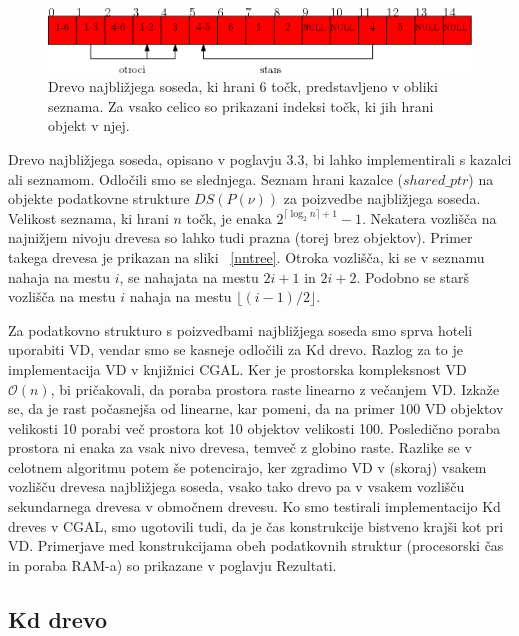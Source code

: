 \documentclass[a4paper, 12pt]{book}
\newcommand{\OO}{\ensuremath{\mathcal{O}}} %
\begin{document}
\begin{figure}
\centerline{\includegraphics[scale=0.5]{pics/nnarray-png.png}}
\caption{Drevo najbližjega soseda, ki hrani 6 točk, predstavljeno v obliki seznama. Za vsako celico so prikazani indeksi točk, ki jih hrani objekt v njej.}
\label{nnarray}
\end{figure}

Drevo najbližjega soseda, opisano v poglavju 3.3, bi lahko implementirali s kazalci ali seznamom. Odločili smo se slednjega. Seznam hrani kazalce ($shared{\_}ptr$) na objekte podatkovne strukture $DS(P(\nu))$ za poizvedbe najbližjega soseda. Velikost seznama, ki hrani $n$ točk, je enaka $2^{\lceil \log_2n \rceil+1}-1$. Nekatera vozlišča na najnižjem nivoju drevesa so lahko tudi prazna (torej brez objektov). Primer takega drevesa je prikazan na sliki ~\ref{nntree}. Otroka vozlišča, ki se v seznamu nahaja na mestu $i$, se nahajata na mestu $2i+1$ in $2i+2$. Podobno se starš vozlišča na mestu $i$ nahaja na mestu $\lfloor(i-1)/2\rfloor$.



Za podatkovno strukturo s poizvedbami najbližjega soseda smo sprva hoteli uporabiti VD, vendar smo se kasneje odločili za Kd drevo. Razlog za to je implementacija VD v knjižnici CGAL. Ker je prostorska kompleksnost VD $\OO(n)$, bi pričakovali, da poraba prostora raste linearno z večanjem VD. Izkaže se, da je rast počasnejša od linearne, kar pomeni, da na primer 100 VD objektov velikosti 10 porabi več prostora kot 10 objektov velikosti 100. Posledično poraba prostora ni enaka za vsak nivo drevesa, temveč z globino raste. Razlike se v celotnem algoritmu potem še potencirajo, ker zgradimo VD v (skoraj) vsakem vozlišču drevesa najbližjega soseda, vsako tako drevo pa v vsakem vozlišču sekundarnega drevesa v območnem drevesu. Ko smo testirali implementacijo Kd dreves v CGAL, smo ugotovili tudi, da je čas konstrukcije bistveno krajši kot pri VD. Primerjave med konstrukcijama obeh podatkovnih struktur (procesorski čas in poraba RAM-a) so prikazane v poglavju Rezultati.

\subsection{Kd drevo}
\end{document}
